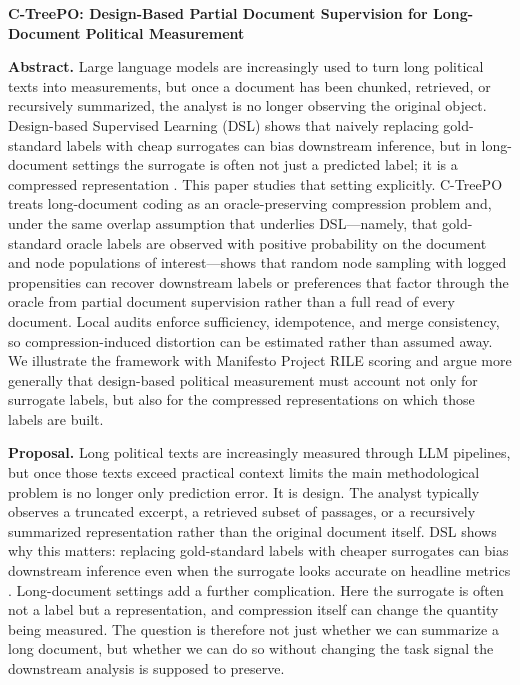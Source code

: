 \documentclass[11pt]{article}
\begin{document}
\begin{center}
{\LARGE \textbf{C-TreePO: Design-Based Partial Document Supervision for Long-Document Political Measurement}\par}
\end{center}

\textbf{Abstract.} Large language models are increasingly used to turn long political texts into measurements, but once a document has been chunked, retrieved, or recursively summarized, the analyst is no longer observing the original object. Design-based Supervised Learning (DSL) shows that naively replacing gold-standard labels with cheap surrogates can bias downstream inference, but in long-document settings the surrogate is often not just a predicted label; it is a compressed representation \citep{EgamiEtAl2024}. This paper studies that setting explicitly. C-TreePO treats long-document coding as an oracle-preserving compression problem and, under the same overlap assumption that underlies DSL---namely, that gold-standard oracle labels are observed with positive probability on the document and node populations of interest---shows that random node sampling with logged propensities can recover downstream labels or preferences that factor through the oracle from partial document supervision rather than a full read of every document. Local audits enforce sufficiency, idempotence, and merge consistency, so compression-induced distortion can be estimated rather than assumed away. We illustrate the framework with Manifesto Project RILE scoring and argue more generally that design-based political measurement must account not only for surrogate labels, but also for the compressed representations on which those labels are built.

\textbf{Proposal.} Long political texts are increasingly measured through LLM pipelines, but once those texts exceed practical context limits the main methodological problem is no longer only prediction error. It is design. The analyst typically observes a truncated excerpt, a retrieved subset of passages, or a recursively summarized representation rather than the original document itself. DSL shows why this matters: replacing gold-standard labels with cheaper surrogates can bias downstream inference even when the surrogate looks accurate on headline metrics \citep{EgamiEtAl2024}. Long-document settings add a further complication. Here the surrogate is often not a label but a representation, and compression itself can change the quantity being measured. The question is therefore not just whether we can summarize a long document, but whether we can do so without changing the task signal the downstream analysis is supposed to preserve.
\end{document}
